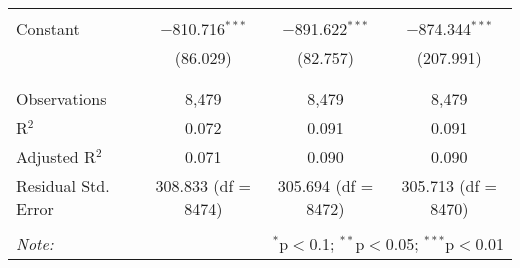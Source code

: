 \begin{table}[!htbp]
\begin{tabular}{@{\extracolsep{5pt}}lccc}
  & & & \\ 
 Constant & $-$810.716$^{***}$ & $-$891.622$^{***}$ & $-$874.344$^{***}$ \\ 
  & (86.029) & (82.757) & (207.991) \\ 
  & & & \\ 
\hline \\[-1.8ex] 
Observations & 8,479 & 8,479 & 8,479 \\ 
R$^{2}$ & 0.072 & 0.091 & 0.091 \\ 
Adjusted R$^{2}$ & 0.071 & 0.090 & 0.090 \\ 
Residual Std. Error & 308.833 (df = 8474) & 305.694 (df = 8472) & 305.713 (df = 8470) \\ 
\hline 
\hline \\[-1.8ex] 
\textit{Note:}  & \multicolumn{3}{r}{$^{*}$p$<$0.1; $^{**}$p$<$0.05; $^{***}$p$<$0.01} \\ 
\end{tabular} 
\end{table} 
